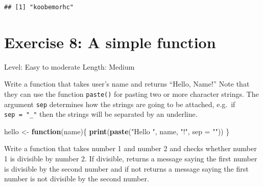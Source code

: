 \documentclass[]{book}
\newenvironment{Shaded}{\begin{snugshade}}{\end{snugshade}}
\newcommand{\ControlFlowTok}[1]{\textcolor[rgb]{0.13,0.29,0.53}{\textbf{#1}}}
\newcommand{\DataTypeTok}[1]{\textcolor[rgb]{0.13,0.29,0.53}{#1}}
\newcommand{\DecValTok}[1]{\textcolor[rgb]{0.00,0.00,0.81}{#1}}
\newcommand{\KeywordTok}[1]{\textcolor[rgb]{0.13,0.29,0.53}{\textbf{#1}}}
\newcommand{\NormalTok}[1]{#1}
\newcommand{\OperatorTok}[1]{\textcolor[rgb]{0.81,0.36,0.00}{\textbf{#1}}}
\newcommand{\StringTok}[1]{\textcolor[rgb]{0.31,0.60,0.02}{#1}}
\begin{document}
\begin{verbatim}
## [1] "koobemorhc"
\end{verbatim}

\hypertarget{exercise-8-a-simple-function}{%
\section*{Exercise 8: A simple function}\label{exercise-8-a-simple-function}}

Level: Easy to moderate
Length: Medium

Write a function that takes user's name and returns ``Hello, Name!'' Note that they can use the function \texttt{paste()} for pasting two or more character strings. The argument \texttt{sep} determines how the strings are going to be attached, e.g.~if \texttt{sep\ =\ "\_"} then the strings will be separated by an underline.

\begin{Shaded}
\begin{Highlighting}[]
\NormalTok{hello <-}\StringTok{ }\ControlFlowTok{function}\NormalTok{(name)\{}
    \KeywordTok{print}\NormalTok{(}\KeywordTok{paste}\NormalTok{(}\StringTok{"Hello "}\NormalTok{, name, }\StringTok{"!"}\NormalTok{, }\DataTypeTok{sep =} \StringTok{""}\NormalTok{))}
\NormalTok{\}}
\end{Highlighting}
\end{Shaded}

Write a function that takes number 1 and number 2 and checks whether number 1 is divisible by number 2. If divisible, returns a message saying the first number is divisible by the second number and if not returns a message saying the first number is not divisible by the second number.

\begin{Shaded}
\end{Shaded}
\end{document}
